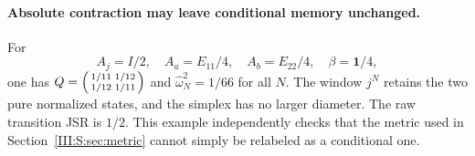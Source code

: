 \paragraph{Absolute contraction may leave conditional memory unchanged.}
For
\[
 A_j=I/2,\quad A_a=E_{11}/4,\quad A_b=E_{22}/4,\quad
 \beta=\mathbf1/4,
\]
one has $Q=\begin{psmallmatrix}1/11&1/12\\1/12&1/11\end{psmallmatrix}$ and
$\widehat\omega_N^2=1/66$ for all $N$. The window $j^N$ retains the two pure normalized states, and the simplex has no larger diameter. The raw transition JSR is $1/2$. This example independently checks that the metric used in Section~\ref{III:S:sec:metric} cannot simply be relabeled as a conditional one.
